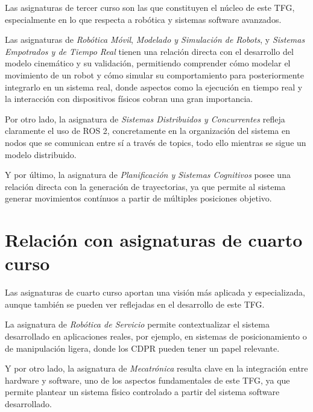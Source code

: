 Las asignaturas de tercer curso son las que constituyen el núcleo de este TFG, especialmente en lo que respecta a robótica y sistemas software avanzados.

\vspace{0.25cm}

Las asignaturas de \textit{Robótica Móvil}, \textit{Modelado y Simulación de Robots}, y \newline \textit{Sistemas Empotrados y de Tiempo Real} tienen una relación directa con el desarrollo del modelo cinemático y su validación, permitiendo comprender cómo modelar el movimiento de un robot y cómo simular su comportamiento para posteriormente integrarlo en un sistema real, donde aspectos como la ejecución en tiempo real y la interacción con dispositivos físicos cobran una gran importancia.

\newpage

Por otro lado, la asignatura de \textit{Sistemas Distribuidos y Concurrentes} refleja claramente el uso de ROS 2, concretamente en la organización del sistema en nodos que se comunican entre sí a través de topics, todo ello mientras se sigue un modelo distribuido.

\vspace{0.25cm}

Y por último, la asignatura de \textit{Planificación y Sistemas Cognitivos} posee una relación directa con la generación de trayectorias, ya que permite al sistema generar movimientos contínuos a partir de múltiples posiciones objetivo.

\section{Relación con asignaturas de cuarto curso}
\label{sec:segundaseccion}

Las asignaturas de cuarto curso aportan una visión más aplicada y especializada, aunque también se pueden ver reflejadas en el desarrollo de este TFG.

\vspace{0.25cm}

La asignatura de \textit{Robótica de Servicio} permite contextualizar el sistema desarrollado en aplicaciones reales, por ejemplo, en sistemas de posicionamiento o de manipulación ligera, donde los CDPR pueden tener un papel relevante.

\vspace{0.25cm}

Y por otro lado, la asignatura de \textit{Mecatrónica} resulta clave en la integración entre hardware y software, uno de los aspectos fundamentales de este TFG, ya que permite plantear un sistema físico controlado a partir del sistema software desarrollado.


